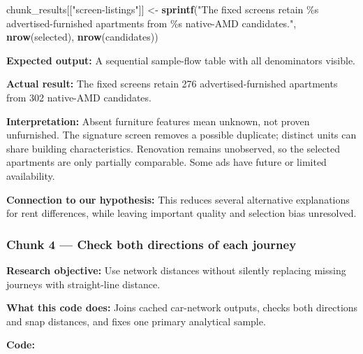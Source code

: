 \documentclass[
]{article}
\newenvironment{Shaded}{\begin{snugshade}}{\end{snugshade}}
\newcommand{\FunctionTok}[1]{\textcolor[rgb]{0.13,0.29,0.53}{\textbf{#1}}}
\newcommand{\NormalTok}[1]{#1}
\newcommand{\OtherTok}[1]{\textcolor[rgb]{0.56,0.35,0.01}{#1}}
\newcommand{\StringTok}[1]{\textcolor[rgb]{0.31,0.60,0.02}{#1}}
\begin{document}
\begin{Shaded}
\begin{Highlighting}[]
\NormalTok{chunk\_results[[}\StringTok{"screen{-}listings"}\NormalTok{]] }\OtherTok{\textless{}{-}} \FunctionTok{sprintf}\NormalTok{(}\StringTok{"The fixed screens retain \%s advertised{-}furnished apartments from \%s native{-}AMD candidates."}\NormalTok{,}
                                            \FunctionTok{nrow}\NormalTok{(selected), }\FunctionTok{nrow}\NormalTok{(candidates))}
\end{Highlighting}
\end{Shaded}

\textbf{Expected output:} A sequential sample-flow table with all
denominators visible.

\textbf{Actual result:} The fixed screens retain 276
advertised-furnished apartments from 302 native-AMD candidates.

\textbf{Interpretation:} Absent furniture features mean unknown, not
proven unfurnished. The signature screen removes a possible duplicate;
distinct units can share building characteristics. Renovation remains
unobserved, so the selected apartments are only partially comparable.
Some ads have future or limited availability.

\textbf{Connection to our hypothesis:} This reduces several alternative
explanations for rent differences, while leaving important quality and
selection bias unresolved.

\subsubsection{Chunk 4 --- Check both directions of each
journey}\label{chunk-4-check-both-directions-of-each-journey}

\textbf{Research objective:} Use network distances without silently
replacing missing journeys with straight-line distance.

\textbf{What this code does:} Joins cached car-network outputs, checks
both directions and snap distances, and fixes one primary analytical
sample.

\textbf{Code:}
\end{document}

